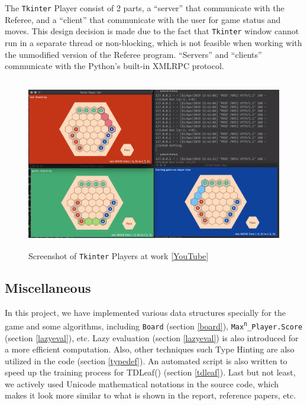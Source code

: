 \documentclass[12pt,a4paper]{article}
\newcommand{\TDLeaf}{TDLeaf(\textlambda)}
\begin{document}
The \texttt{Tkinter} Player consist of 2 parts, a ``server'' that communicate
with the Referee, and a ``client'' that communicate with the user for game
status and moves. This design decision is made due to the fact that 
\texttt{Tkinter} window cannot run in a separate thread or non-blocking, which
is not feasible when working with the unmodified version of the Referee
program. ``Servers'' and ``clients'' communicate with the Python's built-in
XMLRPC protocol.

\begin{figure}[ht]
    \centering
    \includegraphics[height=7.5cm]{tkinter_player}
    \caption{Screenshot of \texttt{Tkinter} Players at work [\href{https://www.youtube.com/watch?v=0pAZfejTCMg}{YouTube}]}
\end{figure}



\subsection{Miscellaneous}
In this project, we have implemented various data structures specially for
the game and some algorithms, including \texttt{Board} (section \ref{board}),
\texttt{Max\textsuperscript{n}\_Player.Score} (section \ref{lazyeval}), etc. 
Lazy evaluation (section \ref{lazyeval}) is also introduced for a more 
efficient computation. Also, other techniques such Type Hinting are also
utilized in the code (section \ref{typedef}). An automated script is also
written to speed up the training process for \TDLeaf{} (section \ref{tdleaf}).
Last but not least, we actively used Unicode mathematical notations in the 
source code, which makes it look more similar to what is shown in the report, 
reference papers, etc. 
\end{document}
